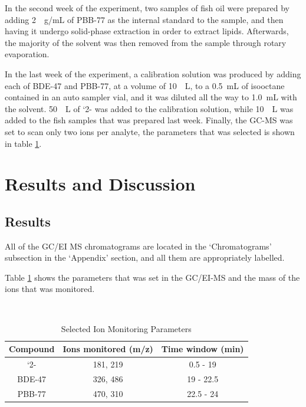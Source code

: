 \documentclass[a4paper, 12pt]{article}
\begin{document}
In the second week of the experiment, two samples of fish oil were prepared by adding \SI{2}{\mu{}g/mL} of PBB-77 as the internal standard to the sample, and then having it undergo solid-phase extraction in order to extract lipids. Afterwards, the majority of the solvent was then removed from the sample through rotary evaporation.

In the last week of the experiment, a calibration solution was produced by adding each of BDE-47 and PBB-77, at a volume of \SI{10}{\mu{}L}, to a \SI{0.5}{mL} of isooctane contained in an auto sampler vial, and it was diluted all the way to \SI{1.0}{mL} with the solvent. \SI{50}{\mu{}L} of `2- was added to the calibration solution, while \SI{10}{\mu{}L} was added to the fish samples that was prepared last week. Finally, the GC-MS was set to scan only two ions per analyte, the parameters that was selected is shown in table \ref{tab-para}.


\section{Results and Discussion}

\subsection{Results}
All of the GC/EI MS chromatograms are located in the `Chromatograms' subsection in the `Appendix' section, and all them are appropriately labelled.

Table \ref{tab-para} shows the parameters that was set in the GC/EI-MS and the mass of the ions that was monitored.

\begin{table}[h!]
	\centering
	\caption{Selected Ion Monitoring Parameters}
	\hfill \\
	\begin{tabular}{|c|c|c|}
		\hline
		Compound & Ions monitored (m/z) & Time window (min) \\
		\hline
		`2-\ce{HCH} & 181, 219 & 0.5 - 19 \\
		\hline
		BDE-47 & 326, 486 & 19 - 22.5 \\
		\hline
		PBB-77 & 470, 310 & 22.5 - 24 \\
		\hline
	\end{tabular}
	\label{tab-para}
\end{table}
\end{document}
